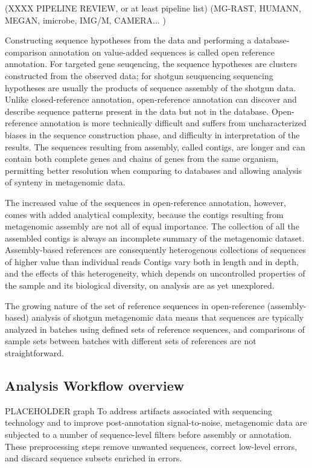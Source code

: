 \documentclass[graybox]{svmult}
\begin{document}
(XXXX PIPELINE REVIEW, or at least pipeline list)  (MG-RAST, HUMANN, MEGAN, imicrobe, IMG/M, CAMERA... )

Constructing sequence hypotheses from the data and performing a database-comparison annotation on value-added sequences is called open reference annotation.   For targeted gene seuqencing, the sequence hypotheses are clusters constructed from the observed data; for shotgun seuquencing sequencing hypotheses are usually the products of sequence assembly of the shotgun data.   Unlike closed-reference annotation, open-reference annotation can discover and describe sequence patterns present in the data but not in the database.  Open-reference annotation is more technically difficult and suffers from uncharacterized biases in the sequence construction phase, and difficulty in interpretation of the results.  The sequences resulting from assembly, called contigs, are longer and can contain both complete genes and chains of genes from the same organism, permitting better resolution when comparing to databases and allowing analysis of synteny in metagenomic data.

The increased value of the sequences in open-reference annotation, however, comes with added analytical complexity, because the contigs resulting from metagenomic assembly are not all of equal importance.
The collection of all the assembled contigs is always an incomplete summary of the metagenomic dataset.
Assembly-based references are consequently heterogenous collections of sequences of higher value than individual reads
Contigs vary both in length and in depth, and the effects of this heterogeneity, which depends on uncontrolled properties of the sample and its biological diversity, on analysis are as yet unexplored.

The growing nature of the set of reference sequences in open-reference (assembly-based) analysis of shotgun metagenomic data means that sequences are typically analyzed in batches using defined sets of reference sequences, and comparisons of sample sets between batches with different sets of references are not straightforward.


\subsection{Analysis Workflow overview}
PLACEHOLDER graph
        To address artifacts associated with sequencing technology and to improve post-annotation signal-to-noise, metagenomic data are subjected to a number of sequence-level filters before assembly or annotation.  These preprocessing steps remove unwanted sequences, correct low-level errors, and discard sequence subsets enriched in errors.
\end{document}
